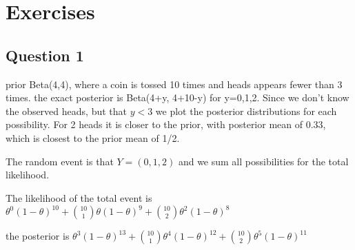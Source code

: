 \documentclass[
]{book}
\theoremstyle{definition}
\theoremstyle{definition}
\theoremstyle{definition}
\theoremstyle{definition}
\theoremstyle{remark}
\begin{document}
\hypertarget{exercises-1}{%
\section{Exercises}\label{exercises-1}}

\hypertarget{question-1}{%
\subsection*{Question 1}\label{question-1}}

prior Beta(4,4), where a coin is tossed 10 times and heads appears fewer than 3 times. the exact posterior is Beta(4+y, 4+10-y) for y=0,1,2. Since we don't know the observed heads, but that \(y<3\) we plot the posterior distributions for each possibility. For 2 heads it is closer to the prior, with posterior mean of 0.33, which is closest to the prior mean of 1/2.

The random event is that \(Y=(0,1,2)\) and we sum all possibilities for the total likelihood.

The likelihood of the total event is \(\theta^0(1-\theta)^{10}+\binom{10}{1}\theta(1-\theta)^9+\binom{10}{2}\theta^2(1-\theta)^8\)

the posterior is \(\theta^3(1-\theta)^{13}+\binom{10}{1}\theta^4(1-\theta)^{12}+\binom{10}{2}\theta^5(1-\theta)^{11}\)
\end{document}
